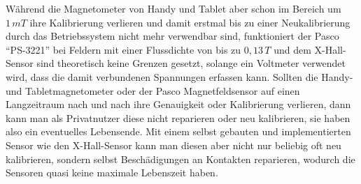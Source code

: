 \documentclass[12pt, a4paper]{article}
\begin{document}
Während die Magnetometer von Handy und Tablet aber schon im Bereich um $1\,mT$ ihre Kalibrierung verlieren und damit erstmal bis zu einer Neukalibrierung durch das Betriebssystem nicht mehr verwendbar sind, funktioniert der Pasco ``PS-3221'' bei Feldern mit einer Flussdichte von bis zu $0,13\,T$ und dem X-Hall-Sensor sind theoretisch keine Grenzen gesetzt, solange ein Voltmeter verwendet wird, dass die damit verbundenen Spannungen erfassen kann.\newline
Sollten die Handy- und Tabletmagnetometer oder der Pasco Magnetfeldsensor auf einen Langzeitraum nach und nach ihre Genauigkeit oder Kalibrierung verlieren, dann kann man als Privatnutzer diese nicht reparieren oder neu kalibrieren, sie haben also ein eventuelles Lebensende.\newline
Mit einem selbst gebauten und implementierten Sensor wie den X-Hall-Sensor kann man diesen aber nicht nur beliebig oft neu kalibrieren, sondern selbst Beschädigungen an Kontakten reparieren, wodurch die Sensoren quasi keine maximale Lebenszeit haben. 
\end{document}
